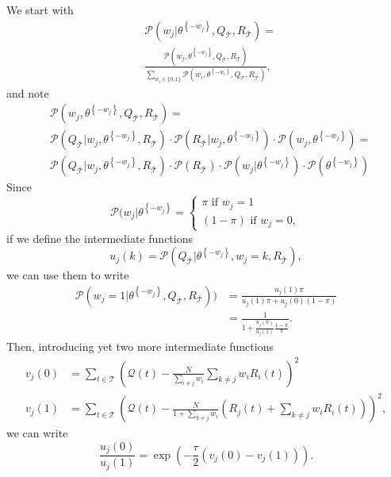 \documentclass[journal]{IEEEtran}
\newcommand{\prob}{\mathcal{P}}
\newcommand{\eventset}{\mathcal{T}}
\newcommand{\context}{{\bar {\mathcal{T}}}}
\newcommand{\drpower}{Q}
\newcommand{\sumdrpower}{{\mathcal{Q}}}
\newcommand{\referencepower}{R}
\newcommand{\outdr}{\drpower_\context}
\newcommand{\outreference}{\referencepower_\context}
\newcommand{\thetasans}[1]{\theta^{\left\{-#1\right\}}}
\begin{document}
We start with
\begin{align}
  & \prob(w_j|\thetasans{w_j}, \outdr, \outreference) = \nonumber \\
  \label{eq:probwj}
  & \frac{\prob(w_j, \thetasans{w_j}, \outdr, \outreference)}
  {\sum_{w_i\in \{0,1\}}\prob(w_i, \thetasans{w_i}, \outdr, \outreference)},
\end{align}
and note
\begin{align*}
  & \prob(w_j, \thetasans{w_j}, \outdr, \outreference) = \\
  & \prob(\outdr | w_j, \thetasans{w_j}, \outreference) \cdot
  \prob(\outreference |w_j, \thetasans{w_j}) \cdot
    \prob(w_j, \thetasans{w_j}) = \\
  & \prob(\outdr | w_j, \thetasans{w_j}, \outreference) \cdot
  \prob(\outreference) \cdot \prob(w_j|\thetasans{w_j}) \cdot
    \prob(\thetasans{w_j})
\end{align*}
Since
\begin{equation*}
  \prob(w_j | \thetasans{w_j} =
  \begin{cases}
    \pi \text{ if } w_j = 1\\
    (1-\pi) \text{ if } w_j = 0,
  \end{cases}
\end{equation*}
if we define the intermediate functions
\begin{equation*}
  u_j(k) = \prob(\outdr|\thetasans{w_j}, w_j=k, \outreference),
\end{equation*}
we can use them to write
\begin{align*}
  \prob(w_j=1|\thetasans{w_j}, \outdr, \outreference))
  &= \frac{u_j(1) \pi}{u_j(1)\pi + u_j(0)(1-\pi)} \\
  &= \frac{1}{1+ \frac{u_j(0)}{u_j(1)}\frac{1-\pi}{\pi}}.
\end{align*}
Then, introducing yet two more intermediate functions
\begin{align*}
  v_j(0) &= \sum_{t\in\eventset} \left(
           \sumdrpower(t) - \frac{N}{\sum_{i\neq j}w_i} \sum_{k\neq j}
           w_i \referencepower_i(t) \right)^2 \\
  v_j(1) &= \sum_{t\in\eventset} \left(
           \sumdrpower(t) - \frac{N}{1+\sum_{k\neq j}w_i} \left(
           \referencepower_j(t) + \sum_{k\neq j}
           w_i \referencepower_i(t) \right) \right)^2,
\end{align*}
we can write
\begin{equation*}
  \frac{u_j(0)}{u_j(1)}
  = \exp \left( -\frac{\tau}{2} \left( v_j(0) - v_j(1) \right)
    \right).
\end{equation*}
\end{document}

